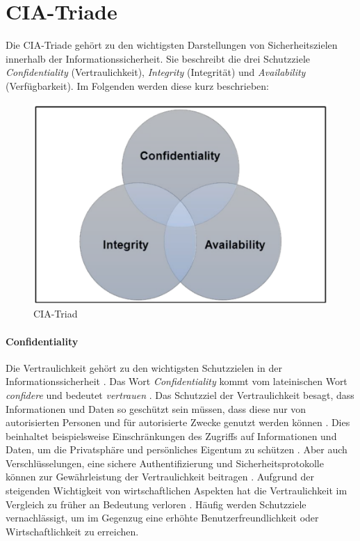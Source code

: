 \section{CIA-Triade}

Die CIA-Triade gehört zu den wichtigsten Darstellungen von Sicherheitszielen innerhalb der Informationssicherheit. Sie beschreibt die drei Schutzziele \textit{Confidentiality} (Vertraulichkeit), \textit{Integrity} (Integrität) und \textit{Availability} (Verfügbarkeit). Im Folgenden werden diese kurz beschrieben:

\begin{figure}[h]
	\centering 
	\includegraphics[width=0.5
    \textwidth]{img/abbildungen/CIA-Triad.png}
	\captionsetup{format=hang}
	\caption{CIA-Triad \cite{samonas2014cia}} \label{CIA-Triad}
\end{figure}

\paragraph*{Confidentiality} 
Die Vertraulichkeit gehört zu den wichtigsten Schutzzielen in der Informationssicherheit \cite{samonas2014cia}. Das Wort \textit{Confidentiality} kommt vom lateinischen Wort \textit{confidere} und bedeutet \textit{vertrauen} \cite{pons} \cite{samonas2014cia}. Das Schutzziel der Vertraulichkeit besagt, dass Informationen und Daten so geschützt sein müssen, dass diese nur von autorisierten Personen und für autorisierte Zwecke genutzt werden können \cite{samonas2014cia}. 
Dies beinhaltet beispielsweise Einschränkungen des Zugriffs auf Informationen und Daten, um die Privatsphäre und persönliches Eigentum zu schützen \cite{samonas2014cia}. Aber auch Verschlüsselungen, eine sichere Authentifizierung und Sicherheitsprotokolle können zur Gewährleistung der Vertraulichkeit beitragen \cite{agarwal2011security}.
Aufgrund der steigenden Wichtigkeit von wirtschaftlichen Aspekten hat die Vertraulichkeit im Vergleich zu früher an Bedeutung verloren \cite{samonas2014cia}. Häufig werden Schutzziele vernachlässigt, um im Gegenzug eine erhöhte Benutzerfreundlichkeit oder Wirtschaftlichkeit zu erreichen.

